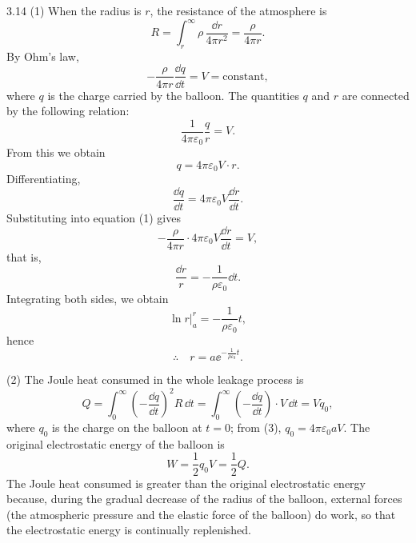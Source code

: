 \begin{solution}{3.14}
(1) When the radius is $r$, the resistance of the atmosphere is
\[
R=\int_r^\infty\rho\,\frac{\dd r}{4\pi r^2}=\frac{\rho}{4\pi r}.
\]
By Ohm's law,
\begin{equation}
-\frac{\rho}{4\pi r}\frac{\dd q}{\dd t}=V=\text{constant}, \tag{1}
\end{equation}
where $q$ is the charge carried by the balloon. The quantities $q$ and $r$ are connected by the following relation:
\begin{equation}
\frac{1}{4\pi\varepsilon_0}\frac{q}{r}=V. \tag{2}
\end{equation}
From this we obtain
\begin{equation}
q=4\pi\varepsilon_0V\cdot r. \tag{3}
\end{equation}
Differentiating,
\begin{equation}
\frac{\dd q}{\dd t}=4\pi\varepsilon_0V\frac{\dd r}{\dd t}. \tag{4}
\end{equation}
Substituting into equation (1) gives
\[
-\frac{\rho}{4\pi r}\cdot4\pi\varepsilon_0V\frac{\dd r}{\dd t}=V,
\]
that is,
\[
\frac{\dd r}{r}=-\frac{1}{\rho\varepsilon_0}\dd t.
\]
Integrating both sides, we obtain
\[
\ln r\Big|_a^r=-\frac{1}{\rho\varepsilon_0}t,
\]
hence
\[
\therefore\quad r=a\ee^{-\frac{1}{\rho\varepsilon_0}t}.
\]

(2) The Joule heat consumed in the whole leakage process is
\[
Q=\int_0^\infty\left(-\frac{\dd q}{\dd t}\right)^2R\,\dd t
=\int_0^\infty\left(-\frac{\dd q}{\dd t}\right)\cdot V\,\dd t=Vq_0,
\]
where $q_0$ is the charge on the balloon at $t=0$; from (3), $q_0=4\pi\varepsilon_0aV$. The original electrostatic energy of the balloon is
\[
W=\frac{1}{2}q_0V=\frac{1}{2}Q.
\]
The Joule heat consumed is greater than the original electrostatic energy because, during the gradual decrease of the radius of the balloon, external forces (the atmospheric pressure and the elastic force of the balloon) do work, so that the electrostatic energy is continually replenished.
\end{solution}

